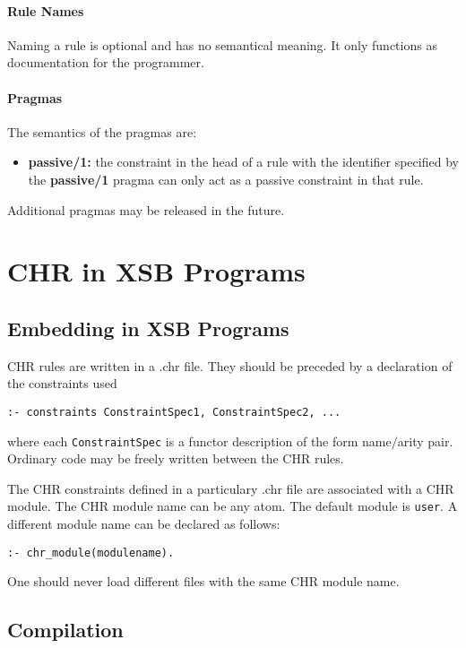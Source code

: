 \paragraph{Rule Names}
Naming a rule is optional and has no semantical meaning. It only functions
as documentation for the programmer.

\paragraph{Pragmas}
The semantics of the pragmas are:
\begin{itemize}
\item \textbf{passive/1:} the constraint in the head of a rule with the identifier specified by
                          the \textbf{passive/1} pragma can only act as a passive constraint in that rule.
\end{itemize}
Additional pragmas may be released in the future.

\section{CHR in XSB Programs} \label{practical}

\subsection{Embedding in XSB Programs}

CHR rules are written in a .chr file. They should be preceded by a declaration of the constraints used
\begin{verbatim}
:- constraints ConstraintSpec1, ConstraintSpec2, ...
\end{verbatim}
where each \texttt{ConstraintSpec} is a functor description of the form name$\slash$arity pair. Ordinary code
may be freely written between the CHR rules.

The CHR constraints defined in a particulary .chr file are associated
with a CHR module. The CHR module name can be any atom. The default module is
\texttt{user}. A different module name can be declared as follows:
\begin{verbatim}
:- chr_module(modulename).
\end{verbatim}
One should never load different files with the same CHR module name.

\subsection{Compilation}


